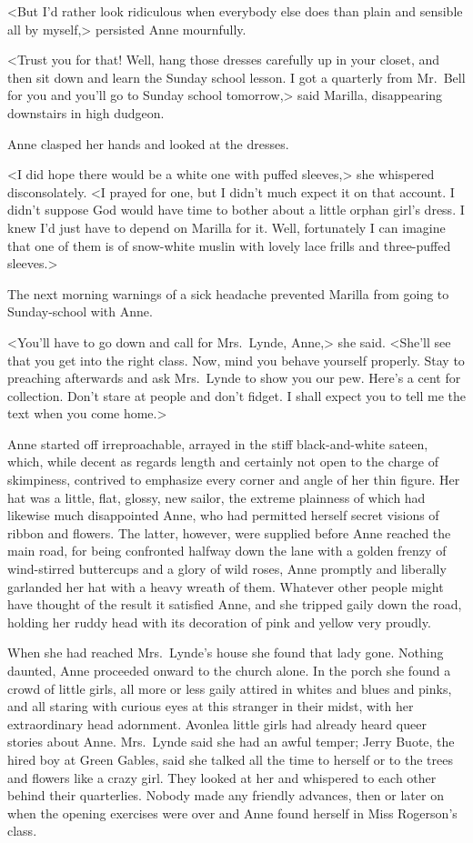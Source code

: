 <But I'd rather look ridiculous when everybody else does than plain and sensible all by myself,> persisted Anne mournfully.

<Trust you for that! Well, hang those dresses carefully up in your closet, and then sit down and learn the Sunday school lesson. I got a quarterly from Mr.~Bell for you and you'll go to Sunday school tomorrow,> said Marilla, disappearing downstairs in high dudgeon.

Anne clasped her hands and looked at the dresses.

<I did hope there would be a white one with puffed sleeves,> she whispered disconsolately. <I prayed for one, but I didn't much expect it on that account. I didn't suppose God would have time to bother about a little orphan girl's dress. I knew I'd just have to depend on Marilla for it. Well, fortunately I can imagine that one of them is of snow-white muslin with lovely lace frills and three-puffed sleeves.>

The next morning warnings of a sick headache prevented Marilla from going to Sunday-school with Anne.

<You'll have to go down and call for Mrs.~Lynde, Anne,> she said. <She'll see that you get into the right class. Now, mind you behave yourself properly. Stay to preaching afterwards and ask Mrs.~Lynde to show you our pew. Here's a cent for collection. Don't stare at people and don't fidget. I shall expect you to tell me the text when you come home.>

Anne started off irreproachable, arrayed in the stiff black-and-white sateen, which, while decent as regards length and certainly not open to the charge of skimpiness, contrived to emphasize every corner and angle of her thin figure. Her hat was a little, flat, glossy, new sailor, the extreme plainness of which had likewise much disappointed Anne, who had permitted herself secret visions of ribbon and flowers. The latter, however, were supplied before Anne reached the main road, for being confronted halfway down the lane with a golden frenzy of wind-stirred buttercups and a glory of wild roses, Anne promptly and liberally garlanded her hat with a heavy wreath of them. Whatever other people might have thought of the result it satisfied Anne, and she tripped gaily down the road, holding her ruddy head with its decoration of pink and yellow very proudly.

When she had reached Mrs.~Lynde's house she found that lady gone. Nothing daunted, Anne proceeded onward to the church alone. In the porch she found a crowd of little girls, all more or less gaily attired in whites and blues and pinks, and all staring with curious eyes at this stranger in their midst, with her extraordinary head adornment. Avonlea little girls had already heard queer stories about Anne. Mrs.~Lynde said she had an awful temper; Jerry Buote, the hired boy at Green Gables, said she talked all the time to herself or to the trees and flowers like a crazy girl. They looked at her and whispered to each other behind their quarterlies. Nobody made any friendly advances, then or later on when the opening exercises were over and Anne found herself in Miss Rogerson's class.

